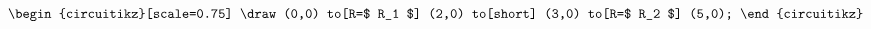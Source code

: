 \[\begin{circuitikz}[scale=0.75]
    \draw (0,0)
    to[R=$ R_1 $] (2,0)
    to[short] (3,0)
    to[R=$ R_2 $] (5,0);
  \end{circuitikz}\]